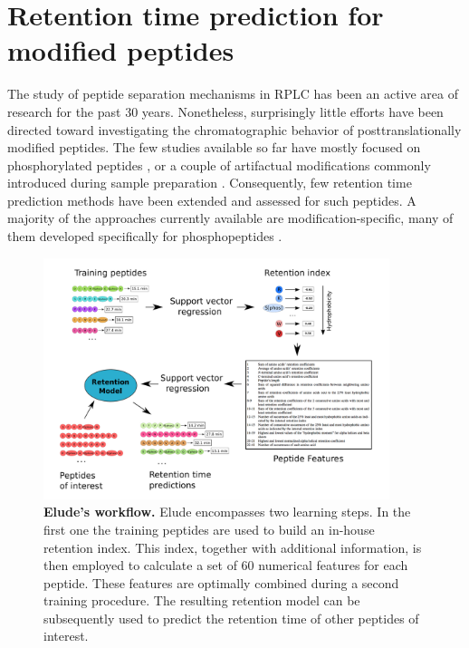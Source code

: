 \documentclass[a4paper]{article}
\begin{document}
\section{\label{sec:rtpredm}Retention time prediction for modified peptides}

The study of peptide separation mechanisms in RPLC has been an active
area of research for the past 30 years. Nonetheless, surprisingly
little efforts have been directed toward investigating the
chromatographic behavior of posttranslationally modified peptides. The
few studies available so far have mostly focused on phosphorylated
peptides \cite{Kim2007}, or a couple of artifactual modifications
commonly introduced during sample preparation
\cite{Reimer2011}. Consequently, few retention time prediction methods
have been extended and assessed for such peptides. A majority of the
approaches currently available are modification-specific, many of them
developed specifically for phosphopeptides \cite{Kawakami2005,
  perlova2010}.

\begin{figure}[!h]
\centering 
\includegraphics[width=0.9\textwidth]{img/elude-ptm.pdf}
\caption{\label{fig:elude} {\bf {\sc Elude}'s workflow.}  {\sc Elude} encompasses two learning steps. In the first one the training peptides are used to build an in-house retention index. This index, together with additional information, is then employed to calculate a set of 60 numerical features for each peptide. These features are optimally combined during a second training procedure. The resulting retention model can be subsequently used to predict the retention time of other peptides of interest.}
\end{figure}
\end{document}
